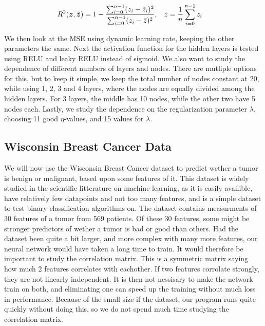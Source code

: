 \documentclass[12pt]{extarticle}
\begin{document}
\begin{align} \label{eq:R2_score}
	R^2(\boldsymbol{z}, \boldsymbol{\tilde{z}}) & = 1 - \frac{\sum_{i=0}^{n-1}(z_i - \tilde{z}_i)^2}{\sum_{i=0}^{n-1}(z_i - \bar{z})^2}, \hspace{3mm} \bar{z} = \frac{1}{n}\sum_{i=0}^{n-1}z_i
\end{align}

We then look at the MSE using dynamic learning rate, keeping the other parameters the same. Next the activation function for the hidden layers is tested using RELU and leaky RELU instead of sigmoid. We also want to study the dependence of different numbers of layers and nodes. There are mutliple options for this, but to keep it simple, we keep the total number of nodes constant at 20, while using 1, 2, 3 and 4 layers, where the nodes are equally divided among the hidden layers. For 3 layers, the middle has 10 nodes, while the other two have 5 nodes each. Lastly, we study the dependence on the regularization parameter $\lambda$, choosing 11 good $\eta$-values, and 15 values for $\lambda$.

\subsection{Wisconsin Breast Cancer Data}
We will now use the Wisconsin Breast Cancer dataset to predict wether a tumor is benign or malignant, based upon some features of it. This dataset is widely studied in the scientific litterature on machine learning, as it is easily availible, have relatively few datapoints and not too many features, and is a simple dataset to test binary classification algorithms on. The dataset contains measurments of 30 features of a tumor from 569 patients. Of these 30 features, some might be stronger predictors of wether a tumor is bad or good than others. Had the dataset been quite a bit larger, and more complex with many more features, our neural network would have taken a long time to train. It would therefore be important to study the correlation matrix. This is a symmetric matrix saying how much 2 features correlates with eachother. If two features corrolate strongly, they are not linearly independent. It is then not nessisary to make the network train on both, and eliminating one can speed up the training without much loss in performance. Because of the small size if the dataset, our program runs quite quickly without doing this, so we do not spend much time studying the correlation matrix.
\end{document}
